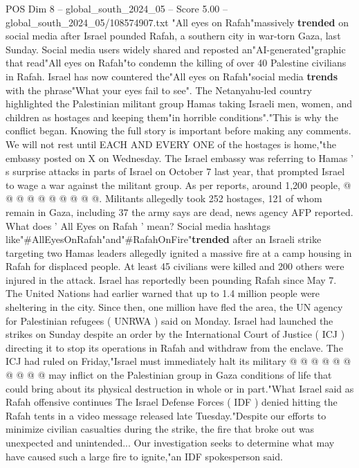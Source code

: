 \begin{textsample}{POS Dim 8 – global\_south\_2024\_05 – Score 5.00 – global\_south\_2024\_05/108574907.txt}  \label{ex:f8_pos_342}
"All eyes on Rafah"massively \textbf{trended} on social media after Israel pounded Rafah, a southern city in war-torn Gaza, last Sunday.
Social media users widely shared and reposted an"AI-generated"graphic that read"All eyes on Rafah"to condemn the killing of over 40 Palestine civilians in Rafah.
Israel has now countered the"All eyes on Rafah"social media \textbf{trends} with the phrase"What your eyes fail to see".
The Netanyahu-led country highlighted the Palestinian militant group Hamas taking Israeli men, women, and children as hostages and keeping them"in horrible conditions"."This is why the conflict began.
Knowing the full story is important before making any comments.
We will not rest until EACH AND EVERY ONE of the hostages is home,"the embassy posted on X on Wednesday.
The Israel embassy was referring to Hamas ' s surprise attacks in parts of Israel on October 7 last year, that prompted Israel to wage a war against the militant group.
As per reports, around 1,200 people, @ @ @ @ @ @ @ @ @ @.
Militants allegedly took 252 hostages, 121 of whom remain in Gaza, including 37 the army says are dead, news agency AFP reported.
What does ' All Eyes on Rafah ' mean?
Social media hashtags like"\#AllEyesOnRafah"and"\#RafahOnFire"\textbf{trended} after an Israeli strike targeting two Hamas leaders allegedly ignited a massive fire at a camp housing in Rafah for displaced people.
At least 45 civilians were killed and 200 others were injured in the attack.
Israel has reportedly been pounding Rafah since May 7.
The United Nations had earlier warned that up to 1.4 million people were sheltering in the city.
Since then, one million have fled the area, the UN agency for Palestinian refugees ( UNRWA ) said on Monday.
Israel had launched the strikes on Sunday despite an order by the International Court of Justice ( ICJ ) directing it to stop its operations in Rafah and withdraw from the enclave.
The ICJ had ruled on Friday,"Israel must immediately halt its military @ @ @ @ @ @ @ @ @ @ may inflict on the Palestinian group in Gaza conditions of life that could bring about its physical destruction in whole or in part."What Israel said as Rafah offensive continues The Israel Defense Forces ( IDF ) denied hitting the Rafah tents in a video message released late Tuesday."Despite our efforts to minimize civilian casualties during the strike, the fire that broke out was unexpected and unintended...
Our investigation seeks to determine what may have caused such a large fire to ignite,"an IDF spokesperson said.

\end{textsample}
